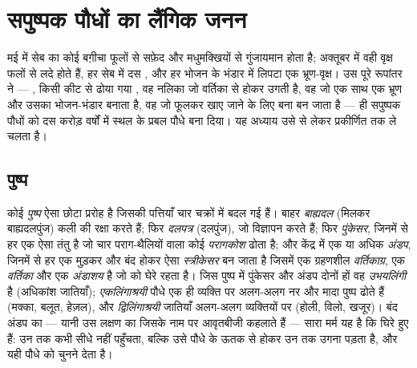 \chapter{सपुष्पक पौधों का लैंगिक जनन}\label{ch:b2:angiosperm-reproduction}

मई में सेब का कोई बग़ीचा फूलों से सफ़ेद और मधुमक्खियों से गुंजायमान होता
है; अक्तूबर में वही वृक्ष फलों से लदे होते हैं, हर सेब में
दस , और हर  भोजन के भंडार में लिपटा एक भ्रूण-वृक्ष। उस पूरे
रूपांतर ने --- , किसी कीट से ढोया गया , वह नलिका जो
वर्तिका से होकर उगती है, वह  जो एक साथ एक भ्रूण और उसका
भोजन-भंडार बनाता है, वह  जो फूलकर खाए जाने के लिए बना  बन जाता
है --- ही सपुष्पक पौधों को दस करोड़ वर्षों में स्थल के
प्रबल पौधे बना दिया। यह अध्याय उसे  से लेकर
प्रकीर्णित  तक ले चलता है।

\section{पुष्प}

\begin{definition}[किसी पुष्प के भाग]\label{def:b2:angiosperm-reproduction:flower}
कोई \emph{पुष्प} ऐसा छोटा प्ररोह है जिसकी पत्तियाँ चार चक्रों में बदल
गई हैं। बाहर \emph{बाह्यदल} (मिलकर बाह्यदलपुंज) कली की रक्षा करते हैं;
फिर \emph{दलपत्र} (दलपुंज), जो विज्ञापन करते हैं; फिर
\emph{पुंकेसर}, जिनमें से हर एक ऐसा तंतु है जो चार पराग-थैलियों वाला
कोई \emph{परागकोश} ढोता है; और केंद्र में एक या अधिक \emph{अंडप},
जिनमें से हर एक मुड़कर और बंद होकर ऐसा \emph{स्त्रीकेसर} बन जाता है
जिसमें एक ग्रहणशील \emph{वर्तिकाग्र}, एक \emph{वर्तिका} और एक
\emph{अंडाशय} है जो \emph{} को घेरे रहता है। जिस पुष्प में
पुंकेसर और अंडप दोनों हों वह \emph{उभयलिंगी} है (अधिकांश जातियाँ);
\emph{एकलिंगाश्रयी} पौधे एक ही व्यक्ति पर अलग-अलग नर और मादा पुष्प ढोते
हैं (मक्का, बलूत, हेज़ल), और \emph{द्विलिंगाश्रयी} जातियाँ अलग-अलग
व्यक्तियों पर (होली, विलो, खजूर)। बंद अंडप का --- यानी उस लक्षण का
जिसके नाम पर आवृतबीजी कहलाते हैं --- सारा मर्म यह है कि 
घिरे हुए हैं:  उन तक कभी सीधे नहीं पहुँचता, बल्कि उसे पौधे के ऊतक
से होकर उन तक उगना पड़ता है, और यही पौधे को चुनने देता है।
\end{definition}

